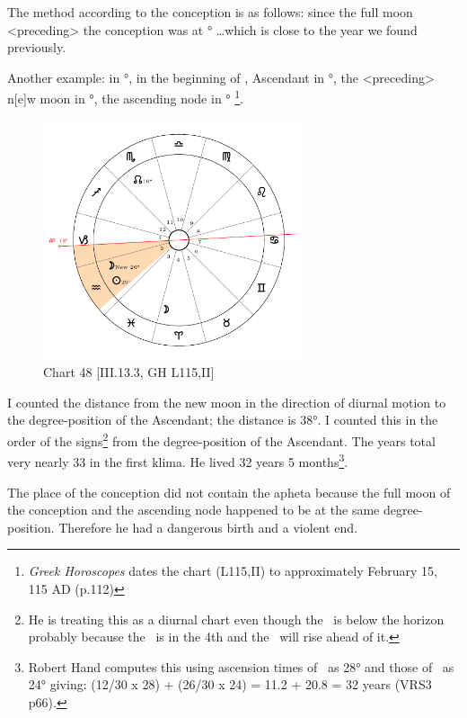 The method according to the conception is as follows: since the full moon <preceding> the conception was at \Capricorn\xspace 21° \ldots which is close to the year we found previously.

\newpage
Another example: \Sun\xspace in \Aquarius\xspace 29°, \Moon\xspace in the beginning of \Aries, Ascendant in \Capricorn\xspace 18°,
the <preceding> n[e]w moon in \Aquarius\xspace 26°, the ascending node in \Scorpio\xspace 16°
\footnote{\textit{Greek Horoscopes} dates the chart (L115,II) to approximately February 15, 115 AD (p.112)}.

\clearpage
\begin{figure}
\centering
\vspace{-20pt}
\includegraphics[width=0.68\textwidth]{charts/3_13_3}
\caption{Chart 48 [III.13.3, GH L115,II]}
\label{fig:chart48}
\end{figure}

I counted the distance from the new moon in the direction of diurnal motion to the degree-position of the Ascendant; the distance is 38°. I counted this in the order of the signs\footnote{He is treating this as a diurnal chart even though the \Sun\, is below the horizon probably because the \Moon\, is in the 4th and the \Sun\, will rise ahead of it.} from the degree-position of the Ascendant. The years total very nearly 33 in the first klima. He lived 32 years 5 months\footnote{Robert Hand computes this using ascension times of \Capricorn\, as 28° and those of \Aquarius\, as 24° giving: (12/30 x 28) + (26/30 x 24) = 11.2 + 20.8 = 32 years (VRS3 p66).}. 

The place of the conception did not contain the apheta because the full moon of the conception and the ascending node happened to be at the same degree-position. Therefore he had a dangerous birth and a violent end.

\newpage